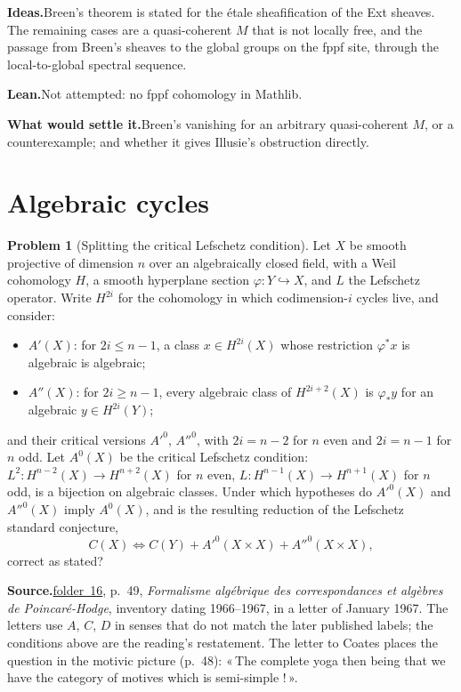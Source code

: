 \documentclass[11pt]{article}
\newcommand{\q}[1]{«\,#1\,»}
\newcommand{\fac}[1]{\href{https://grothendieck.umontpellier.fr/#1.pdf}{folder~#1}}
\theoremstyle{definition}
\newtheorem{problem}{Problem}
\theoremstyle{plain}\newtheorem*{proposition}{Proposition}\theoremstyle{definition}
\newcommand{\entry}[1]{\par\medskip\noindent\textbf{#1}\enspace}
\newcommand{\src}[1]{\entry{Source.}#1}
\newcommand{\ideas}{\entry{Ideas.}}
\newcommand{\leanst}{\entry{Lean.}}
\newcommand{\settle}{\entry{What would settle it.}}
\begin{document}
\ideas Breen's theorem is stated for the étale sheafification of the Ext sheaves. The remaining cases are a quasi-coherent $M$ that is not locally free, and the passage from Breen's sheaves to the global groups on the fppf site, through the local-to-global spectral sequence.

\leanst Not attempted: no fppf cohomology in Mathlib.

\settle Breen's vanishing for an arbitrary quasi-coherent $M$, or a counterexample; and whether it gives Illusie's obstruction directly.

\section{Algebraic cycles}

\begin{problem}[Splitting the critical Lefschetz condition]\label{p:lef}
Let $X$ be smooth projective of dimension $n$ over an algebraically closed field, with a Weil cohomology $H$, a smooth hyperplane section $\varphi : Y \hookrightarrow X$, and $L$ the Lefschetz operator. Write $H^{2i}$ for the cohomology in which codimension-$i$ cycles live, and consider:
\begin{itemize}
\item $A'(X)$: for $2i \le n-1$, a class $x \in H^{2i}(X)$ whose restriction $\varphi^*x$ is algebraic is algebraic;
\item $A''(X)$: for $2i \ge n-1$, every algebraic class of $H^{2i+2}(X)$ is $\varphi_*y$ for an algebraic $y \in H^{2i}(Y)$;
\end{itemize}
and their critical versions $A'^{0}$, $A''^{0}$, with $2i = n-2$ for $n$ even and $2i = n-1$ for $n$ odd. Let $A^0(X)$ be the critical Lefschetz condition: $L^2 : H^{n-2}(X) \to H^{n+2}(X)$ for $n$ even, $L : H^{n-1}(X) \to H^{n+1}(X)$ for $n$ odd, is a bijection on algebraic classes. Under which hypotheses do $A'^{0}(X)$ and $A''^{0}(X)$ imply $A^0(X)$, and is the resulting reduction of the Lefschetz standard conjecture,
\[
C(X) \iff C(Y) + A'^{0}(X \times X) + A''^{0}(X \times X),
\]
correct as stated?
\end{problem}

\src{\fac{16}, p.~49, \emph{Formalisme algébrique des correspondances et algèbres de Poincaré-Hodge}, inventory dating 1966--1967, in a letter of January 1967. The letters use $A$, $C$, $D$ in senses that do not match the later published labels; the conditions above are the reading's restatement. The letter to Coates places the question in the motivic picture (p.~48): \q{The complete yoga then being that we have the category of motives which is semi-simple !}.}
\end{document}
